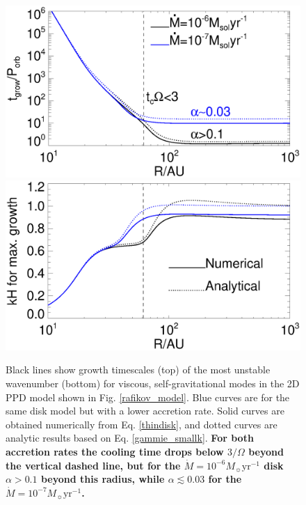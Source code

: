\begin{figure}
  \includegraphics[width=\linewidth,clip=true,trim=0cm 2cm 0cm
    0.0cm]{figures/ppd_2d_growth}\\
  \includegraphics[width=\linewidth,clip=true,trim=0cm 0cm 0cm
    0.cm]{figures/ppd_2d_maxk}
  \caption{Black lines show growth timescales (top) of the most
    unstable wavenumber (bottom) for viscous, 
    self-gravitational modes in the 2D PPD model shown in
    Fig. \ref{rafikov_model}. Blue curves are for the same disk
    model but with a lower accretion rate. Solid curves are obtained
    numerically from Eq. \ref{thindisk}, and dotted curves 
    are analytic results based on Eq. \ref{gammie_smallk}. 
    {\bf 
      For both accretion rates the cooling time drops below $3/\Omega$
      beyond the vertical dashed line, but for the  
      $\dot{M}=10^{-6}M_\sun\mathrm{yr}^{-1}$ disk $\alpha > 0.1$
      beyond this radius, while $\alpha\lesssim
      0.03$  for the
      $\dot{M}=10^{-7}M_\sun\mathrm{yr}^{-1}$. 
    }
    \label{rafikov_growth}}
\end{figure}

